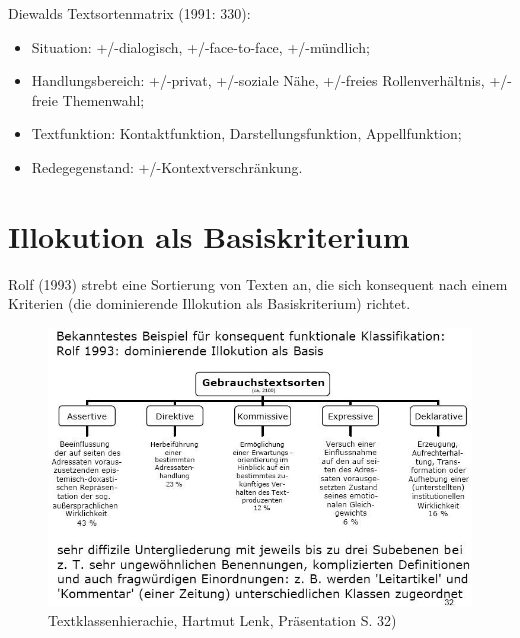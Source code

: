 \documentclass[
  letterpaper,
]{scrbook}
\providecommand{\tightlist}{%
  \setlength{\itemsep}{0pt}\setlength{\parskip}{0pt}}\usepackage{longtable,booktabs,array}
\begin{document}
Diewalds Textsortenmatrix (1991: 330):\\

\begin{itemize}
\tightlist
\item
  Situation: +/-dialogisch, +/-face-to-face, +/-mündlich;\\
\item
  Handlungsbereich: +/-privat, +/-soziale Nähe, +/-freies
  Rollenverhältnis, +/-freie Themenwahl;\\
\item
  Textfunktion: Kontaktfunktion, Darstellungsfunktion, Appellfunktion;\\
\item
  Redegegenstand: +/-Kontextverschränkung.\\
\end{itemize}

\hypertarget{illokution-als-basiskriterium}{%
\section{Illokution als
Basiskriterium}\label{illokution-als-basiskriterium}}

Rolf (1993) strebt eine Sortierung von Texten an, die sich konsequent
nach einem Kriterien (die dominierende Illokution als Basiskriterium)
richtet.

\begin{figure}

{\centering \includegraphics[width=1\textwidth,height=\textheight]{./pictures/Funktionale_Klassifizierung_Rolf1993.jpg}

}

\caption{Textklassenhierachie, Hartmut Lenk, Präsentation S. 32)}

\end{figure}
\end{document}
